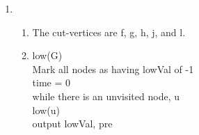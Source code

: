 
\usepackage{amsmath, verbatim, tikz, float}

\usetikzlibrary{arrows,automata}

\oddsidemargin 0in
\evensidemargin 0in
\textwidth 6.5in
\topmargin -0.5in
\textheight 9.0in
\newcommand{\norm}[1]{\left\lVert #1 \right\rVert}


\pagestyle{myheadings}

\begin{enumerate}
\item
  \begin{enumerate}
    \item
      The cut-vertices are f, g, h, j, and l.
    \item
      \begin{algorithm}
        low(G)\\
        \>Mark all nodes as having lowVal of -1\\
        \>time = 0\\
        \>while there is an unvisited node, u\\
        \>\>low(u)\\
        \>output lowVal, pre\\\\
        

\end{algorithm}
\end{enumerate}
\end{enumerate}

